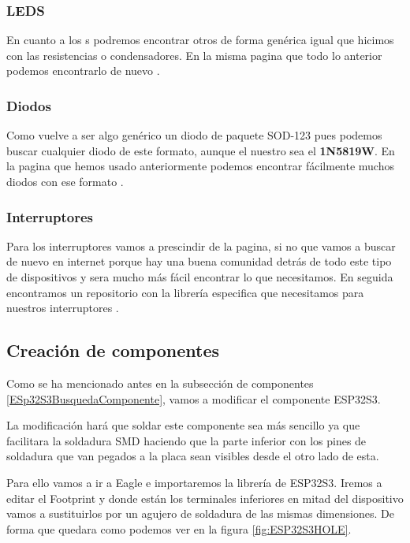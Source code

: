 \subsubsection{\gls{LED}S}

En cuanto a los s podremos encontrar otros de forma genérica igual que hicimos con las resistencias o condensadores. En la misma pagina que todo lo anterior podemos encontrarlo de nuevo \cite{SnapedaWS2812B}.

\subsubsection{Diodos}

Como vuelve a ser algo genérico un diodo de paquete SOD-123 pues podemos buscar cualquier diodo de este formato, aunque el nuestro sea el \textbf{1N5819W}. En la pagina que hemos usado anteriormente podemos encontrar fácilmente muchos diodos con ese formato \cite{Snapeda1N5819W}.

\subsubsection{Interruptores}

Para los interruptores vamos a prescindir de la pagina, si no que vamos a buscar de nuevo en internet porque hay una buena comunidad detrás de todo este tipo de dispositivos y sera mucho más fácil encontrar lo que necesitamos. En seguida encontramos un repositorio con la librería especifica que necesitamos para nuestros interruptores \cite{GitInterruptores}.

\newpage
\subsection{Creación de componentes}

Como se ha mencionado antes en la subsección de componentes \ref{ESp32S3BusquedaComponente}, vamos a modificar el componente ESP32S3.

La modificación hará que soldar este componente sea más sencillo ya que facilitara la soldadura \gls{SMD} haciendo que la parte inferior con los pines de soldadura que van pegados a la placa sean visibles desde el otro lado de esta.

Para ello vamos a ir a Eagle e importaremos la librería de ESP32S3. Iremos a editar el \gls{Footprint} y donde están los terminales inferiores en mitad del dispositivo vamos a sustituirlos por un agujero de soldadura de las mismas dimensiones. De forma que quedara como podemos ver en la figura \ref{fig:ESP32S3HOLE}.

